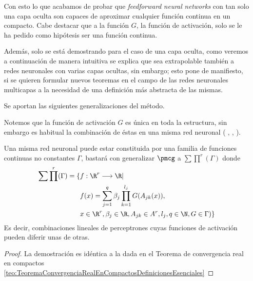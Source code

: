 Con esto lo que acabamos de probar que \textit{feedforward neural networks} con tan solo una capa oculta  son capaces de aproximar cualquier 
función continua en un compacto.  Cabe destacar que a la función $G$, la función de activación,
 solo se le ha pedido como 
hipótesis ser una función continua.     

Además, solo se está demostrando para el caso de una capa oculta, como veremos a continuación  de 
manera intuitiva se explica que sea extrapolable también a redes neuronales 
con varias capas ocultas, sin embargo; esto pone de manifiesto, si se quieren formular nuevos teoremas en el campo de las redes neuronales
multicapas a la necesidad de una definición más abstracta de las mismas. 


Se aportan las siguientes generalizaciones del método. 

Notemos que la función de activación $G$ es única en toda la estructura,
sin embargo es habitual la combinación de éstas en una misma red neuronal (
\cite{DBLP:journals/corr/abs-1811-03378}, 
 \cite{8258768}, 
 \cite{DBLP:journals/corr/SzegedyVISW15}
). 

\begin{corolario}

    Una misma red neuronal puede estar constituida por una familia de funciones continuas no constantes $\Gamma$, 
    bastará con generalizar $\pmcg$ a $\sum \prod ^r (\Gamma)$ donde 
    \begin{equation}
        \begin{split}
            \sum \prod^r (\Gamma) = \{ 
                &f: \R^r \longrightarrow \R | \\
                & f(x) = \sum_{j = 1} ^q  \beta_j \prod_{k=1}^{l_j}
                G(A_{jk}(x)), \\
                &x  \in \R^r, \beta_j \in \R, A_{jk}\in A^r, l_j,q \in \N, G \in \Gamma
                )
                \}
        \end{split}
    \end{equation}
    Es decir, combinaciones lineales de perceptrones cuyas funciones 
    de activación pueden diferir unas de otras. 
\end{corolario}

\begin{proof}
    La demostración es idéntica a la dada en el Teorema de convergencia 
    real en compactos \ref{teo:TeoremaConvergenciaRealEnCompactosDefinicionesEsenciales}
\end{proof}

